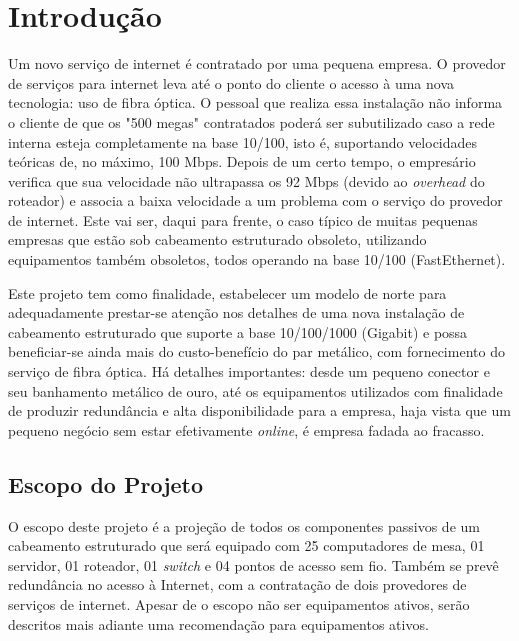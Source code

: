 \documentclass[	DIV=calc,%
							paper=a4,%
							fontsize=12pt,%
							onecolumn]{scrartcl}	 					%
\begin{document}
\clearpage
\renewcommand{\contentsname}{Sumário}
\tableofcontents
\clearpage

\section{Introdução}

Um novo serviço de internet é contratado por uma pequena empresa. O provedor de serviços para internet leva até o ponto do cliente o acesso à uma nova tecnologia: uso de fibra óptica. O pessoal que realiza essa instalação não informa o cliente de que os "500 megas" contratados poderá ser subutilizado caso a rede interna esteja completamente na base 10/100, isto é, suportando velocidades teóricas de, no máximo, 100 Mbps. Depois de um certo tempo, o empresário verifica que sua velocidade não ultrapassa os 92 Mbps (devido ao \textit{overhead} do roteador) e associa a baixa velocidade a um problema com o serviço do provedor de internet. Este vai ser, daqui para frente, o caso típico de muitas pequenas empresas que estão sob cabeamento estruturado obsoleto, utilizando equipamentos também obsoletos, todos operando na base 10/100 (FastEthernet).
\bigskip

Este projeto tem como finalidade, estabelecer um modelo de norte para adequadamente prestar-se atenção nos detalhes de uma nova instalação de cabeamento estruturado que suporte a base 10/100/1000 (Gigabit) e possa beneficiar-se ainda mais do custo-benefício do par metálico, com fornecimento do serviço de fibra óptica. Há detalhes importantes: desde um pequeno conector e seu banhamento metálico de ouro, até os equipamentos utilizados com finalidade de produzir redundância e alta disponibilidade para a empresa, haja vista que um pequeno negócio sem estar efetivamente \textit{online}, é empresa fadada ao fracasso.
\bigskip

\subsection{Escopo do Projeto}
O escopo deste projeto é a projeção de todos os componentes passivos de um cabeamento estruturado que será equipado com 25 computadores de mesa, 01 servidor, 01 roteador, 01 \textit{switch} e 04 pontos de acesso sem fio. Também se prevê redundância no acesso à Internet, com a contratação de dois provedores de serviços de internet. Apesar de o escopo não ser equipamentos ativos, serão descritos mais adiante uma recomendação para equipamentos ativos.
\end{document}
